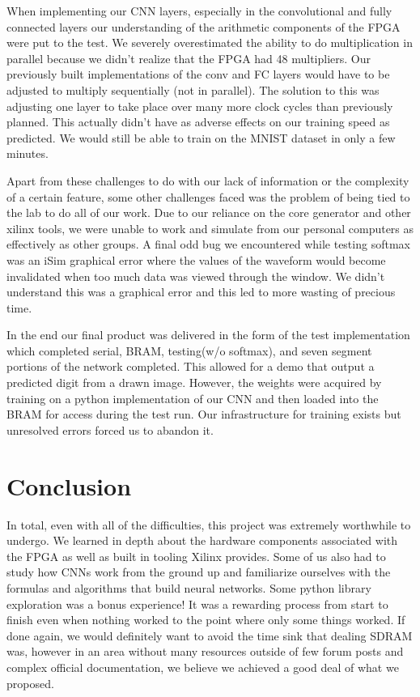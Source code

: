 \documentclass[11pt]{article}
\begin{document}
When implementing our CNN layers, especially in the convolutional and fully connected layers our understanding of the arithmetic components of the FPGA were put to the test. We severely overestimated the ability to do multiplication in parallel because we didn’t realize that the FPGA had 48 multipliers. Our previously built implementations of the conv and FC layers would have to be adjusted to multiply sequentially (not in parallel). The solution to this was adjusting one layer to take place over many more clock cycles than previously planned. This actually didn’t have as adverse effects on our training speed as predicted. We would still be able to train on the MNIST dataset in only a few minutes.

Apart from these challenges to do with our lack of information or the complexity of a certain feature, some other challenges faced was the problem of being tied to the lab to do all of our work. Due to our reliance on the core generator and other xilinx tools, we were unable to work and simulate from our personal computers as effectively as other groups. A final odd bug we encountered while testing softmax was an iSim graphical error where the values of the waveform would become invalidated when too much data was viewed through the window. We didn’t understand this was a graphical error and this led to more wasting of precious time. 

In the end our final product was delivered in the form of the test implementation which completed serial, BRAM, testing(w/o softmax), and seven segment portions of the network completed. This allowed for a demo that output a predicted digit from a drawn image. However, the weights were acquired by training on a python implementation of our CNN and then loaded into the BRAM for access during the test run. Our infrastructure for training exists but unresolved errors forced us to abandon it.

\section{Conclusion}

In total, even with all of the difficulties, this project was extremely worthwhile to undergo. We learned in depth about the hardware components associated with the FPGA as well as built in tooling Xilinx provides. Some of us also had to study how CNNs work from the ground up and familiarize ourselves with the formulas and algorithms that build neural networks. Some python library exploration was a bonus experience! It was a rewarding process from start to finish even when nothing worked to the point where only some things worked. If done again, we would definitely want to avoid the time sink that dealing SDRAM was, however in an area without many resources outside of few forum posts and complex official documentation, we believe we achieved a good deal of what we proposed.
\end{document}
